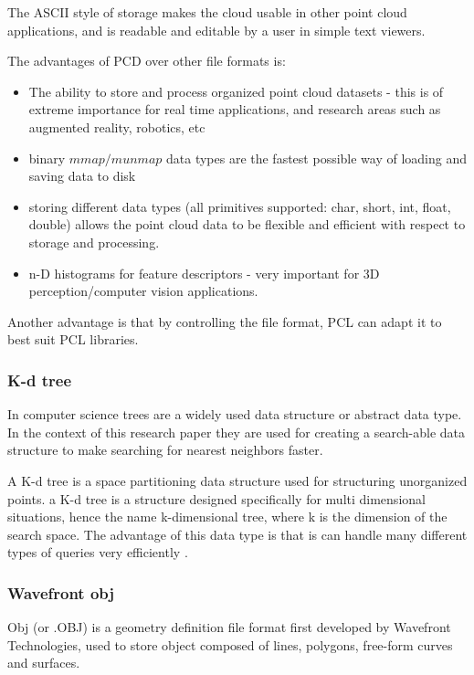 			The ASCII style of storage makes the cloud usable in other point cloud applications, and is readable and editable by a user in simple text viewers.
			
			The advantages of PCD over other file formats is:
			\begin{itemize}
				\item  The ability to store and process organized point cloud datasets - this is of extreme importance for real time applications, and research areas such as augmented reality, robotics, etc
				
				\item binary $mmap/munmap$ data types are the fastest possible way of loading and saving data to disk
				
				\item storing different data types (all primitives supported: char, short, int, float, double) allows the point cloud data to be flexible and efficient with respect to storage and processing.
				
				\item n-D histograms for feature descriptors - very important for 3D perception/computer vision applications.
			\end{itemize}
			
			Another advantage is that by controlling the file format, PCL can adapt it to best suit PCL libraries. \citep{point_cloud_library_pcd_2010}
		
		\subsubsection{K-d tree}
			In computer science trees are a widely used data structure or abstract data type. In the context of this research paper they are used for creating a search-able data structure to make searching for nearest neighbors faster.
			
			A K-d tree is a space partitioning data structure used for structuring unorganized points. a K-d tree is a structure designed specifically for multi dimensional situations, hence the name k-dimensional tree, where k is the dimension of the search space. The advantage of this data type is that is can handle many different types of queries very efficiently \citep{bentley_multidimensional_1975}.
		
		
		\subsubsection{Wavefront obj}
			Obj (or .OBJ) is a geometry definition file format first developed by Wavefront Technologies, used to store object composed of lines, polygons, free-form curves and surfaces.
			
